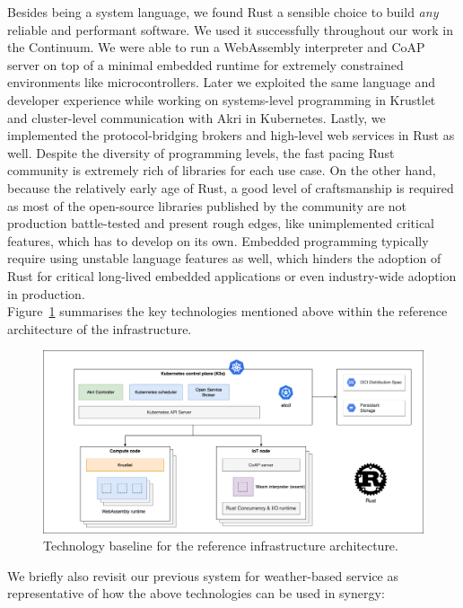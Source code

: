 Besides being a system language, we found Rust a sensible choice to build \emph{any} reliable and performant software. We used it successfully throughout our work in the Continuum. We were able to run a WebAssembly interpreter and CoAP server on top of a minimal embedded runtime for extremely constrained environments like microcontrollers. Later we exploited the same language and developer experience while working on systems-level programming in Krustlet and cluster-level communication with Akri in Kubernetes. Lastly, we implemented the protocol-bridging brokers and high-level web services in Rust as well. Despite the diversity of programming levels, the fast pacing Rust community is extremely rich of libraries for each use case. On the other hand, because the relatively early age of Rust, a good level of craftsmanship is required as most of the open-source libraries published by the community are not production battle-tested and present rough edges, like unimplemented critical features, which has to develop on its own. Embedded programming typically require using unstable language features as well, which hinders the adoption of Rust for critical long-lived embedded applications or even industry-wide adoption in production.\\

Figure~\ref{fig:architecture-technologies} summarises the key technologies mentioned above within the reference architecture of the infrastructure.

\begin{figure}[ht]
\centering
\includegraphics[width=\columnwidth]{figures/architecture-technologies}
\caption{Technology baseline for the reference infrastructure architecture.} \label{fig:architecture-technologies}
\end{figure}

We briefly also revisit our previous system for weather-based service as representative of how the above technologies can be used in synergy:

